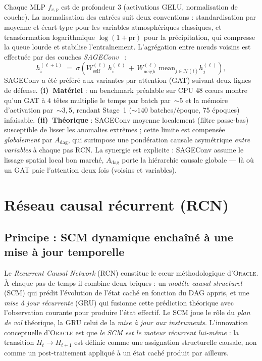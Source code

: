 \documentclass[14pt,a4paper,openany]{extreport}
\theoremstyle{definition}
\newcommand{\Oracle}{\textsc{Oracle}}
\newcommand{\Adag}{\ensuremath{A_{\mathrm{dag}}}}
\newcommand{\Ht}{\ensuremath{H_t}}
\begin{document}
Chaque MLP $f_{v,p}$ est de profondeur 3 (activations GELU, normalisation de couche). La normalisation des entrées suit deux conventions : standardisation par moyenne et écart-type pour les variables atmosphériques classiques, et transformation logarithmique $\log(1 + \mathrm{pr})$ pour la précipitation, qui compresse la queue lourde et stabilise l'entraînement. L'agrégation entre nœuds voisins est effectuée par des couches \emph{SAGEConv}~\cite{hamilton_sage_2017} :
\begin{equation}
  h_i^{(\ell+1)} \;=\; \sigma\!\left( W_{\mathrm{self}}^{(\ell)}\, h_i^{(\ell)} \,+\, W_{\mathrm{neigh}}^{(\ell)}\, \mathrm{mean}_{j \in \mathcal{N}(i)} h_j^{(\ell)} \right),
  \label{eq:sageconv}
\end{equation}
SAGEConv a été préféré aux variantes par attention (GAT) suivant deux lignes de défense. \textbf{(i)~Matériel} : un benchmark préalable sur CPU 48 c\oe urs montre qu'un GAT à $4$ têtes multiplie le temps par batch par~$\sim$$5$ et la mémoire d'activation par~$\sim$$3{,}5$, rendant Stage~1 ($\sim$$140$ batches/époque, $75$ époques) infaisable. \textbf{(ii)~Théorique} : SAGEConv moyenne localement (filtre passe-bas) susceptible de lisser les anomalies extrêmes ; cette limite est compensée \emph{globalement} par $\Adag$, qui surimpose une pondération causale asymétrique \emph{entre variables} à chaque pas RCN. La synergie est explicite : SAGEConv assume le lissage spatial local bon marché, $\Adag$ porte la hiérarchie causale globale --- là où un GAT paie l'attention deux fois (voisins et variables).

\section{Réseau causal récurrent (RCN)}
\label{sec:oracle-rcn}

\subsection{Principe : SCM dynamique enchaîné à une mise à jour temporelle}
\label{ssec:oracle-rcn-principe}

Le \emph{Recurrent Causal Network} (RCN) constitue le cœur méthodologique d'\Oracle{}. À chaque pas de temps il combine deux briques : un \emph{modèle causal structurel} (SCM) qui prédit l'évolution de l'état caché en fonction du DAG appris, et une \emph{mise à jour récurrente} (GRU) qui fusionne cette prédiction théorique avec l'observation courante pour produire l'état effectif. Le SCM joue le rôle du \emph{plan de vol} théorique, la GRU celui de la \emph{mise à jour aux instruments}. L'innovation conceptuelle d'\Oracle{} est que \emph{le SCM est le moteur récurrent lui-même} : la transition $\Ht \to H_{t+1}$ est définie comme une assignation structurelle causale, non comme un post-traitement appliqué à un état caché produit par ailleurs.
\end{document}
